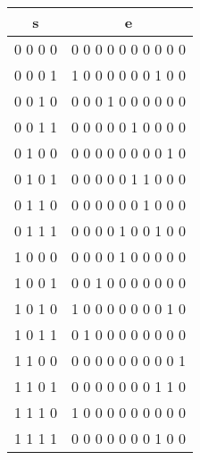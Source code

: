 \documentclass[fontsize=14pt]{article}
\begin{document}
\begin{center}
\begin{tabular}{ |c|c| } 
\hline
s & e\\
\hline\hline 
0 0 0 0 & 0 0 0 0 0 0 0 0 0 0\\
\hline
0 0 0 1 & 1 0 0 0 0 0 0 1 0 0\\
\hline
0 0 1 0 & 0 0 0 1 0 0 0 0 0 0\\ 
\hline
0 0 1 1 & 0 0 0 0 0 1 0 0 0 0\\ 
\hline
0 1 0 0 & 0 0 0 0 0 0 0 0 1 0\\ 
\hline
0 1 0 1 & 0 0 0 0 0 1 1 0 0 0\\ 
\hline
0 1 1 0 & 0 0 0 0 0 0 1 0 0 0\\ 
\hline
0 1 1 1 & 0 0 0 0 1 0 0 1 0 0\\ 
\hline
1 0 0 0 & 0 0 0 0 1 0 0 0 0 0\\ 
\hline
1 0 0 1 & 0 0 1 0 0 0 0 0 0 0\\
\hline
1 0 1 0 & 1 0 0 0 0 0 0 0 1 0\\ 
\hline
1 0 1 1 & 0 1 0 0 0 0 0 0 0 0\\ 
\hline
1 1 0 0 & 0 0 0 0 0 0 0 0 0 1\\ 
\hline
1 1 0 1 & 0 0 0 0 0 0 0 1 1 0\\ 
\hline
1 1 1 0 & 1 0 0 0 0 0 0 0 0 0\\ 
\hline
1 1 1 1 & 0 0 0 0 0 0 0 1 0 0\\
\hline
\end{tabular}
\end{center}
\end{document}
